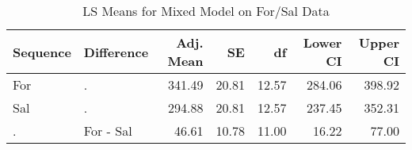 \begin{table}

\caption{\label{tab:pefrDataLSMeans}LS Means for Mixed Model on For/Sal Data}
\centering
\begin{tabular}[t]{l>{}l|rrrrr}
\toprule
Sequence & Difference & Adj. Mean & SE & df & Lower CI & Upper CI\\
\midrule
For & . & 341.49 & 20.81 & 12.57 & 284.06 & 398.92\\
Sal & . & 294.88 & 20.81 & 12.57 & 237.45 & 352.31\\
. & For - Sal & 46.61 & 10.78 & 11.00 & 16.22 & 77.00\\
\bottomrule
\end{tabular}
\end{table}
